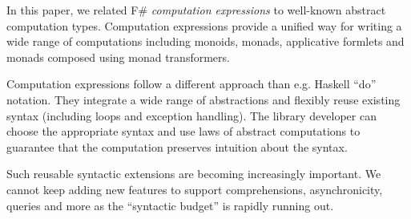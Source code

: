 \documentclass[runningheads,a4paper]{llncs}
\begin{document}
In this paper, we related F\# \emph{computation expressions} to well-known abstract computation 
types. Computation expressions provide a unified way for writing a wide range of computations 
including monoids, monads, applicative formlets and monads composed using monad transformers.

Computation expressions follow a different approach than e.g. Haskell ``do'' notation. They
integrate a wide range of abstractions and flexibly reuse existing syntax (including loops and 
exception handling). The library developer can choose the appropriate syntax and use laws of
abstract computations to guarantee that the computation preserves intuition about the syntax.

Such reusable syntactic extensions are becoming increasingly important. We cannot keep adding
new features to support comprehensions, asynchronicity, queries and more as the ``syntactic budget''
is rapidly running out.


%
%

\vspace{-1em}


\end{document}
